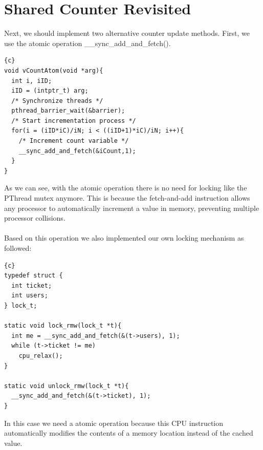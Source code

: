 \documentclass{article}
\newcommand{\enterProblemHeader}[1]{
}
\newcommand{\exitProblemHeader}[1]{
}
\newcounter{homeworkProblemCounter} %
\newcommand{\homeworkProblemName}{}
\newenvironment{homeworkProblem}[1][Problem \arabic{homeworkProblemCounter}]{ %
\stepcounter{homeworkProblemCounter} %
\renewcommand{\homeworkProblemName}{#1} %
\section{\homeworkProblemName} %
}{
}
\begin{document}
\begin{homeworkProblem}[Shared Counter Revisited]
Next, we should implement two alternative counter update methods. First, we use the atomic
operation \_\_sync\_add\_and\_fetch().
\begin{lstlisting}{c}
void vCountAtom(void *arg){
  int i, iID;
  iID = (intptr_t) arg;
  /* Synchronize threads */
  pthread_barrier_wait(&barrier);
  /* Start incrementation process */
  for(i = (iID*iC)/iN; i < ((iID+1)*iC)/iN; i++){
    /* Increment count variable */
    __sync_add_and_fetch(&iCount,1);
  }
}
\end{lstlisting}
As we can see, with the atomic operation there is no need for locking like the PThread
mutex anymore. This is because the fetch-and-add instruction allows any processor to 
automatically increment a value in memory, preventing multiple processor collisions.
\\\\
Based on this operation we also implemented our own locking mechanism as followed:
\begin{lstlisting}{c}
typedef struct {
  int ticket;
  int users;
} lock_t;

static void lock_rmw(lock_t *t){
  int me = __sync_add_and_fetch(&(t->users), 1);
  while (t->ticket != me)
    cpu_relax();
}

static void unlock_rmw(lock_t *t){
  __sync_add_and_fetch(&(t->ticket), 1);
}
\end{lstlisting}
In this case we need a atomic operation because this CPU instruction automatically modifies
the contents of a memory location instead of the cached value.
\end{homeworkProblem}
\pagebreak
\end{document}
